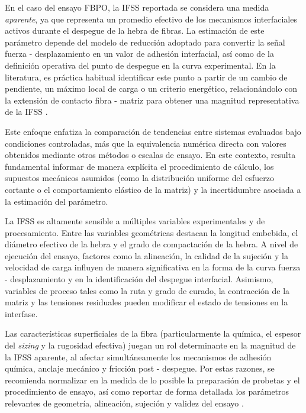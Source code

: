 En el caso del ensayo FBPO, la IFSS reportada se considera una medida \emph{aparente}, ya que
representa un promedio efectivo de los mecanismos interfaciales activos durante el despegue de
la hebra de fibras. La estimación de este parámetro depende del modelo de reducción adoptado para
convertir la señal fuerza - desplazamiento en un valor de adhesión interfacial, así como de la
definición operativa del punto de despegue en la curva experimental. En la literatura, es práctica
habitual identificar este punto a partir de un cambio de pendiente, un máximo local de carga o un
criterio energético, relacionándolo con la extensión de contacto fibra - matriz para obtener una
magnitud representativa de la IFSS \cite{Fischer2020, Liu2021, DeLeon2022}.

Este enfoque enfatiza la comparación de tendencias entre sistemas evaluados bajo condiciones
controladas, más que la equivalencia numérica directa con valores obtenidos mediante otros métodos
o escalas de ensayo. En este contexto, resulta fundamental informar de manera explícita el
procedimiento de cálculo, los supuestos mecánicos asumidos (como la distribución uniforme del
esfuerzo cortante o el comportamiento elástico de la matriz) y la incertidumbre asociada a la
estimación del parámetro.

La IFSS es altamente sensible a múltiples variables experimentales y de procesamiento. Entre las
variables geométricas destacan la longitud embebida, el diámetro efectivo de la hebra y el grado de
compactación de la hebra. A nivel de ejecución del ensayo, factores como la alineación, la calidad
de la sujeción y la velocidad de carga influyen de manera significativa en la forma de la curva
fuerza - desplazamiento y en la identificación del despegue interfacial. Asimismo, variables de
proceso tales como la ruta y grado de curado, la contracción de la matriz y las tensiones
residuales pueden modificar el estado de tensiones en la interfase.

Las características superficiales de la fibra (particularmente la química, el espesor del
\textit{sizing} y la rugosidad efectiva) juegan un rol determinante en la magnitud de la IFSS
aparente, al afectar simultáneamente los mecanismos de adhesión química, anclaje mecánico y
fricción post - despegue. Por estas razones, se recomienda normalizar en la medida de lo posible la
preparación de probetas y el procedimiento de ensayo, así como reportar de forma detallada los
parámetros relevantes de geometría, alineación, sujeción y validez del ensayo
\cite{ISO19375, Fischer2020, Liu2021, Zhou2016}.

